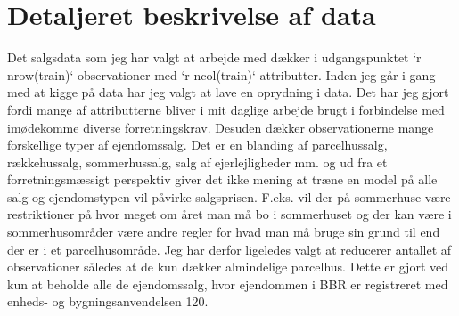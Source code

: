 \documentclass{report}
\begin{document}
\section{Detaljeret beskrivelse af data}



Det salgsdata som jeg har valgt at arbejde med dækker i udgangspunktet `r nrow(train)` observationer med `r ncol(train)` attributter. Inden jeg går i gang med at kigge på data har jeg valgt at lave en oprydning i data. Det har jeg gjort fordi mange af attributterne bliver i mit daglige arbejde brugt i forbindelse med imødekomme diverse forretningskrav. Desuden dækker observationerne mange forskellige typer af ejendomssalg. Det er en blanding af parcelhussalg, rækkehussalg, sommerhussalg, salg af ejerlejligheder mm. og ud fra et forretningsmæssigt perspektiv giver det ikke mening at træne en model på alle salg og ejendomstypen vil påvirke salgsprisen. F.eks. vil der på sommerhuse være restriktioner på hvor meget om året man må bo i sommerhuset og der kan være i sommerhusområder være andre regler for hvad man må bruge sin grund til end der er i et parcelhusområde. Jeg har derfor ligeledes valgt at reducerer antallet af observationer således at de kun dækker almindelige parcelhus. Dette er gjort ved kun at beholde alle de ejendomssalg, hvor ejendommen i BBR er registreret med enheds- og bygningsanvendelsen 120. 
\end{document}
